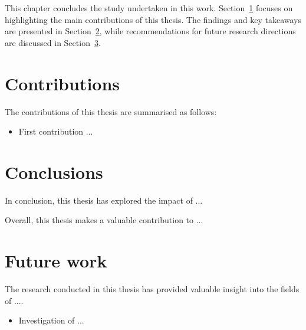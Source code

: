 This chapter concludes the study undertaken in this work. Section~\ref{sec5:contributions} focuses on highlighting the main contributions of this thesis. The findings and key takeaways are presented in Section~\ref{sec5:conclusions}, while recommendations for future research directions are discussed in Section~\ref{sec5:future}.

\section{Contributions}
\label{sec5:contributions}

The contributions of this thesis are summarised as follows:

\begin{itemize}
\item First contribution ...
\end{itemize}

\section{Conclusions}
\label{sec5:conclusions}

In conclusion, this thesis has explored the impact of ...

Overall, this thesis makes a valuable contribution to ...
\section{Future work}
\label{sec5:future}

The research conducted in this thesis has provided valuable insight into the fields of ....

\begin{itemize}

\item Investigation of ...
    
\end{itemize}

